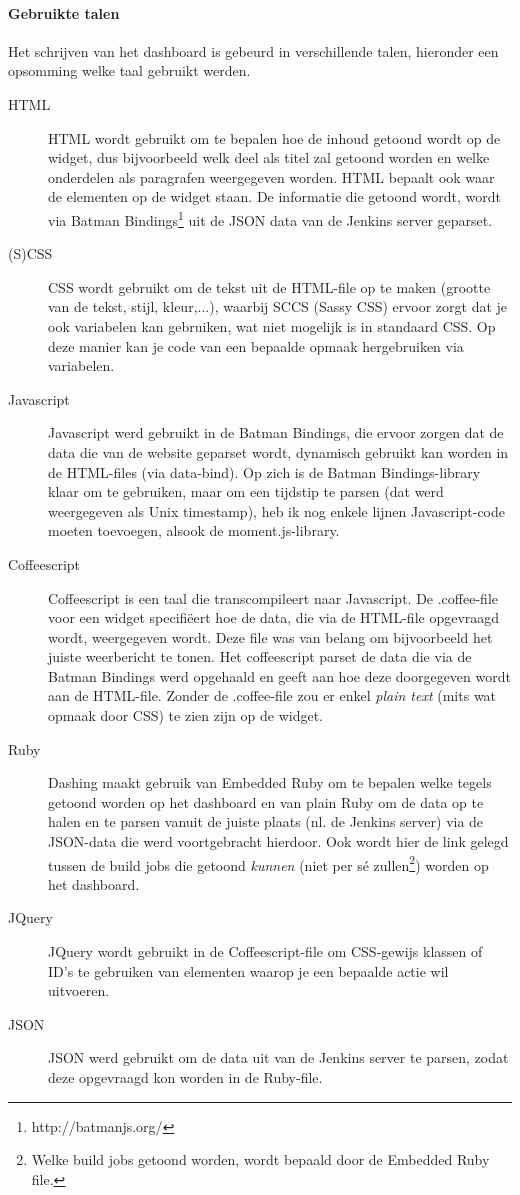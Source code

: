 \documentclass[10pt,a4paper]{article}
\begin{document}
\paragraph{Gebruikte talen}
Het schrijven van het dashboard is gebeurd in verschillende talen, hieronder een opsomming welke taal gebruikt werden.
\begin{description}
\item[HTML] HTML wordt gebruikt om te bepalen hoe de inhoud getoond wordt op de widget, dus bijvoorbeeld welk deel als titel zal getoond worden en welke onderdelen als paragrafen weergegeven worden. HTML bepaalt ook waar de elementen op de widget staan. De informatie die getoond wordt, wordt via Batman Bindings\footnote{http://batmanjs.org/} uit de JSON data van de Jenkins server geparset. 
\item[(S)CSS] CSS wordt gebruikt om de tekst uit de HTML-file op te maken (grootte van de tekst, stijl, kleur,...), waarbij SCCS (Sassy CSS) ervoor zorgt dat je ook variabelen kan gebruiken, wat niet mogelijk is in standaard CSS. Op deze manier kan je code van een bepaalde opmaak hergebruiken via variabelen. 
\item[Javascript] Javascript werd gebruikt in de Batman Bindings, die ervoor zorgen dat de data die van de website geparset wordt, dynamisch gebruikt kan worden in de HTML-files (via data-bind). Op zich is de Batman Bindings-library klaar om te gebruiken, maar om een tijdstip te parsen (dat werd weergegeven als Unix timestamp), heb ik nog enkele lijnen Javascript-code moeten toevoegen, alsook de moment.js-library.
\item[Coffeescript] Coffeescript is een taal die transcompileert naar Javascript. De .coffee-file voor een widget specifi\"eert hoe de data, die via de HTML-file opgevraagd wordt, weergegeven wordt. Deze file was van belang om bijvoorbeeld het juiste weerbericht te tonen. Het coffeescript parset de data die via de Batman Bindings werd opgehaald en geeft aan hoe deze doorgegeven wordt aan de HTML-file. Zonder de .coffee-file zou er enkel \textit{plain text} (mits wat opmaak door CSS) te zien zijn op de widget.
\item[Ruby] Dashing maakt gebruik van Embedded Ruby om te bepalen welke tegels getoond worden op het dashboard en van plain Ruby om de data op te halen en te parsen vanuit de juiste plaats (nl. de Jenkins server) via de JSON-data die werd voortgebracht hierdoor. Ook wordt hier de link gelegd tussen de build jobs die getoond \emph{kunnen} (niet per s\'e zullen\footnote{Welke build jobs getoond worden, wordt bepaald door de Embedded Ruby file.}) worden op het dashboard.
\item[JQuery] JQuery wordt gebruikt in de Coffeescript-file om CSS-gewijs klassen of ID's te gebruiken van elementen waarop je een bepaalde actie wil uitvoeren.
\item[JSON] JSON werd gebruikt om de data uit van de Jenkins server te parsen, zodat deze opgevraagd kon worden in de Ruby-file.
\end{description}
\end{document}
